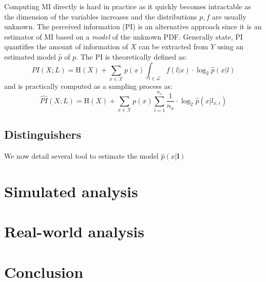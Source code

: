 \documentclass{llncs}
\begin{document}
Computing MI directly is hard in practice as it quickly becomes intractable as the dimension of the variables increases and the distributions $p, f$ are usually unknown. 
The perceived information (PI) is an alternative approach since it is an estimator of MI based on a \textit{model} of the unknown PDF. Generally state, PI quantifies the amount of information of $X$ can be extracted from $Y$ using an estimated model $\hat{p}$ of $p$. The PI is theoretically defined as:
\begin{equation*}
	PI(X; L) = \text{H}(X) + \sum_{x \in \mathcal{X}} p(x)\int_{l \in \mathcal{L}}f(l|x)\cdot \log_2 \hat{p}(x|l)
\end{equation*}
and is practically computed as a sampling process as:
\begin{equation}
	\widehat{PI}(X; L) = \text{H}(X) + \sum_{x \in \mathcal{X}} p(x)\sum_{i=1}^{n_x}\frac{1}{n_x}\cdot \log_2 \hat{p}(x|l_{x, i})
\end{equation}
\subsection*{Distinguishers}
We now detail several tool to estimate the model $\hat{p}(x|\bm{l})$
\section{Simulated analysis} 

\section{Real-world analysis}


\section{Conclusion}





\end{document}
